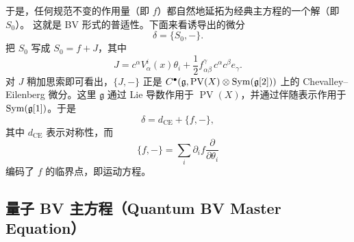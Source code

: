 

于是，任何规范不变的作用量（即 $f$）都自然地延拓为经典主方程的一个解（即 $S_0$）。
这就是 BV 形式的普适性。下面来看诱导出的微分
\[
  \delta = \{S_0,-\}.
\]
把 $S_0$ 写成 $S_0 = f + J$，其中
\[
  J = c^\alpha V_\alpha^i(x)\theta_i + \frac{1}{2} f^{\gamma}_{\alpha\beta}\, c^\alpha c^\beta e_\gamma .
\]
对 $J$ 稍加思索即可看出，$\{J,-\}$ 正是
$C^\bullet(\mathfrak{g},\operatorname{PV}(X)\otimes\operatorname{Sym}(\mathfrak{g}[2]))$ 上的
Chevalley--Eilenberg 微分。这里 $\mathfrak{g}$ 通过 Lie 导数作用于
$\operatorname{PV}(X)$，并通过伴随表示作用于 $\operatorname{Sym}(\mathfrak{g}[1])$。于是
\[
  \delta = d_{\mathrm{CE}} + \{f,-\},
\]
其中 $d_{\mathrm{CE}}$ 表示对称性，而
\[
  \{f,-\} = \sum_i \partial_i f \frac{\partial}{\partial \theta_i}
\]
编码了 $f$ 的临界点，即运动方程。



\subsection{量子 BV 主方程（Quantum BV Master Equation）}


